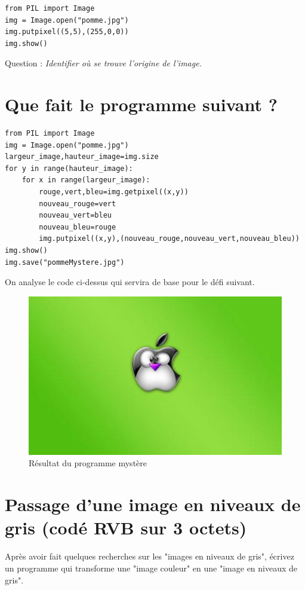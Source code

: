 \documentclass[11pt]{article}
\begin{document}
\begin{verbatim}
from PIL import Image
img = Image.open("pomme.jpg")
img.putpixel((5,5),(255,0,0))
img.show()
\end{verbatim}

Question : \emph{Identifier où se trouve l'origine de l'image.}


\section{Que fait le programme suivant ?}
\label{sec:org0fc92f7}

\begin{verbatim}
from PIL import Image
img = Image.open("pomme.jpg")
largeur_image,hauteur_image=img.size
for y in range(hauteur_image):
    for x in range(largeur_image):
        rouge,vert,bleu=img.getpixel((x,y))
        nouveau_rouge=vert
        nouveau_vert=bleu
        nouveau_bleu=rouge
        img.putpixel((x,y),(nouveau_rouge,nouveau_vert,nouveau_bleu))
img.show()
img.save("pommeMystere.jpg")
\end{verbatim}


On analyse le code ci-dessus qui servira de base pour le défi suivant.

\begin{figure}[htbp]
\centering
\includegraphics[width=.9\linewidth]{pommeMystere.jpg}
\caption{Résultat du programme mystère}
\end{figure}


\section{Passage d'une image en niveaux de gris (codé RVB sur 3 octets)}
\label{sec:org1fde869}

Après avoir fait quelques recherches sur les "images en niveaux de gris", écrivez un programme qui transforme une "image couleur" en une "image en niveaux de gris".
\end{document}

